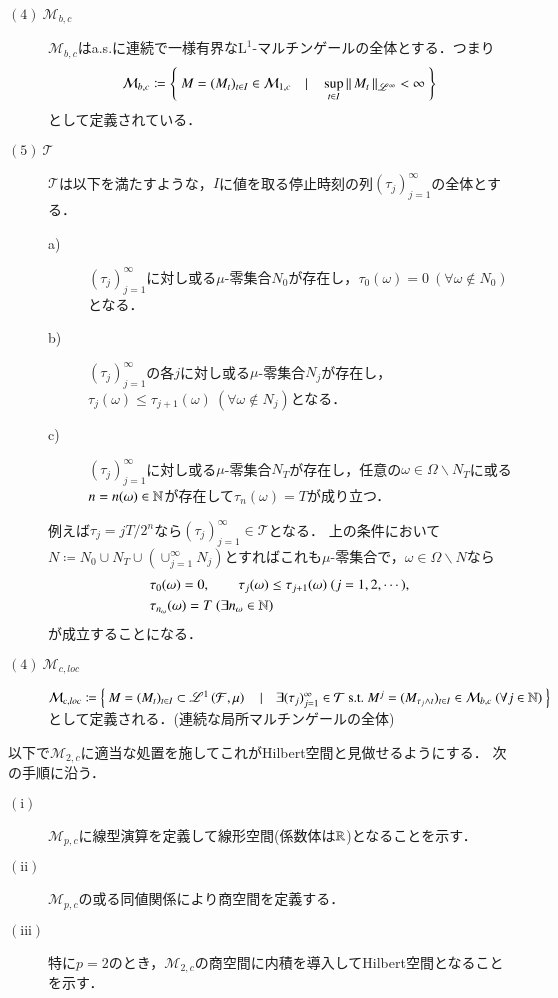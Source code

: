 \begin{description}
		\item[$\mathrm{(4)}\ \mathcal{M}_{b,c}$]
			$\mathcal{M}_{b,c}$はa.s.に連続で一様有界な$\mathrm{L}^1$-マルチンゲールの全体とする．つまり
			\begin{align}
				\mathcal{M}_{b,c} \coloneqq \left\{\ M = (M_t)_{t \in I} \in \mathcal{M}_{1,c}\quad |\quad \operatorname*{sup}_{t \in I} \left\|\, M_t\, \right\|_{\mathscr{L}^\infty} < \infty\ \right\}
			\end{align}
			として定義されている．
			
		\item[$\mathrm{(5)}\ \mathcal{T}$]
			$\mathcal{T}$は以下を満たすような，$I$に値を取る停止時刻の列$(\tau_j)_{j=1}^{\infty}$の全体とする．
			\begin{description}
				\item[a)] $(\tau_j)_{j=1}^{\infty}$に対し或る$\mu$-零集合$N_0$が存在し，$\tau_0(\omega) = 0\ (\forall \omega \notin N_0)$となる．
				\item[b)] $(\tau_j)_{j=1}^{\infty}$の各$j$に対し或る$\mu$-零集合$N_j$が存在し，$\tau_j(\omega) \leq \tau_{j+1}(\omega)\ (\forall \omega \notin N_j)$となる．
				\item[c)] $(\tau_j)_{j=1}^{\infty}$に対し或る$\mu$-零集合$N_T$が存在し，任意の$\omega \in \Omega \backslash N_T$に或る$n = n(\omega) \in \mathbb{N}$が存在して$\tau_n(\omega)=T$が成り立つ．
			\end{description}
			例えば$\tau_j = jT/2^n$なら$(\tau_j)_{j=1}^{\infty} \in \mathcal{T}$となる．
			上の条件において$N \coloneqq N_0 \cup N_T \cup (\cup_{j=1}^{\infty}N_j)$とすればこれも$\mu$-零集合で，$\omega \in \Omega \backslash N$なら
			\begin{align}
				&\tau_0(\omega) = 0,\qquad \tau_j(\omega) \leq \tau_{j+1}(\omega)\ (j=1,2,\cdots),\\
				&\tau_{n_\omega}(\omega) = T\ (\exists n_\omega \in \mathbb{N})
			\end{align}
			が成立することになる．
			
		\item[$\mathrm{(4)}\ \mathcal{M}_{c,loc}$]
			$\mathcal{M}_{c,loc} \coloneqq 
			\left\{\ M = (M_t)_{t \in I} \subset \mathscr{L}^{1} \left(\mathcal{F},\mu\right) \quad |\quad \exists (\tau_j)_{j=1}^{\infty} \in \mathcal{T}\ \mathrm{s.t.}\ M^j = (M_{\tau_j \wedge t})_{t \in I} \in \mathcal{M}_{b,c}\ (\forall j \in \mathbb{N}) \ \right\}$
			として定義される．(連続な局所マルチンゲールの全体)
	\end{description}
	
	以下で$\mathcal{M}_{2,c}$に適当な処置を施してこれがHilbert空間と見做せるようにする．
	次の手順に沿う．
	\begin{description}
		\item[$\mathrm{(i)}$] $\mathcal{M}_{p,c}$に線型演算を定義して線形空間(係数体は$\mathbb{R}$)となることを示す．
		\item[$\mathrm{(ii)}$] $\mathcal{M}_{p,c}$の或る同値関係により商空間を定義する．
		\item[$\mathrm{(iii)}$] 特に$p=2$のとき，$\mathcal{M}_{2,c}$の商空間に内積を導入してHilbert空間となることを示す．
	\end{description}
	
